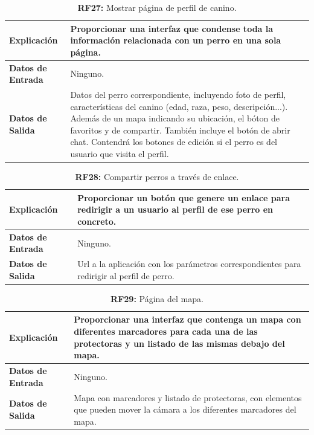 \documentclass[a4paper, 12pt]{article}
\begin{document}
\begin{table}[H]
\captionsetup{justification=raggedright,singlelinecheck=false}
\caption{\textbf{RF27:} Mostrar página de perfil de canino.}
\label{tab:RF27}
	\begin{tabular}{|m{5cm}|m{10cm}|}
	\hline
	\textbf{Explicación} & Proporcionar una interfaz que condense toda la información relacionada con un perro en una sola página. \\ 
	\hline
	\textbf{Datos de Entrada} & Ninguno. \\ 
	\hline
	\textbf{Datos de Salida} & Datos del perro correspondiente, incluyendo foto de perfil, características del canino (edad, raza, peso, descripción...). Además de un mapa indicando su ubicación, el bóton de favoritos y de compartir. También incluye el botón de abrir chat. Contendrá los botones de edición si el perro es del usuario que visita el perfil. \\ 
	\hline
\end{tabular}
\end{table}

\begin{table}[H]
\captionsetup{justification=raggedright,singlelinecheck=false}
\caption{\textbf{RF28:} Compartir perros a través de enlace.}
\label{tab:RF28}
	\begin{tabular}{|m{5cm}|m{10cm}|}
	\hline
	\textbf{Explicación} & Proporcionar un botón que genere un enlace para redirigir a un usuario al perfil de ese perro en concreto. \\ 
	\hline
	\textbf{Datos de Entrada} & Ninguno. \\ 
	\hline
	\textbf{Datos de Salida} & Url a la aplicación con los parámetros correspondientes para redirigir al perfil de perro. \\ 
	\hline
\end{tabular}
\end{table}

\begin{table}[H]
\captionsetup{justification=raggedright,singlelinecheck=false}
\caption{\textbf{RF29:} Página del mapa.}
\label{tab:RF29}
	\begin{tabular}{|m{5cm}|m{10cm}|}
	\hline
	\textbf{Explicación} & Proporcionar una interfaz que contenga un mapa con diferentes marcadores para cada una de las protectoras y un listado de las mismas debajo del mapa. \\ 
	\hline
	\textbf{Datos de Entrada} & Ninguno. \\ 
	\hline
	\textbf{Datos de Salida} & Mapa con marcadores y listado de protectoras, con elementos que pueden mover la cámara a los diferentes marcadores del mapa. \\ 
	\hline
\end{tabular}
\end{table}
\end{document}
